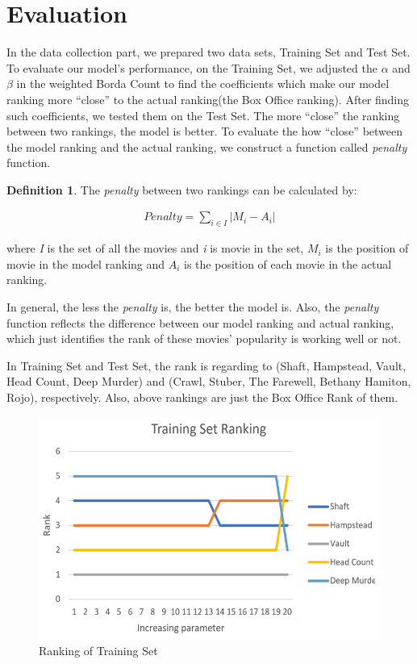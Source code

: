 \documentclass[conference]{IEEEtran}
\theoremstyle{definition}
\newtheorem{definition}{Definition}
\begin{document}
\section{Evaluation}
In the data collection part, we prepared two data sets, Training Set and Test
Set. To evaluate our model's performance, on the Training Set, we adjusted the
$\alpha$ and $\beta$ in the weighted Borda Count to find the coefficients which
make our model ranking more ``close'' to the actual ranking(the Box Office ranking). After finding such coefficients, we
tested them on the Test Set. The more ``close'' the ranking between two rankings,
the model is better. To evaluate the how ``close'' between the model
ranking and the actual ranking, we construct a function called \textit{penalty}
function. 
\begin{definition}{The \textit{penalty} between two rankings can be calculated by:}
	
	\begin{align}
	Penalty = \sum_{i\in I}{|M_i - A_i|}
	\end{align}
	
	where \textit{I} is the set of all the movies and \textit{i} is movie in the
	set, $M_i$ is the position of movie in the model ranking and $A_i$ is the
	position of each movie in the actual ranking.
	
\end{definition}

In general, the less the \textit{penalty} is, the better the model is. Also, the
\textit{penalty} function reflects the difference between our model ranking and
actual ranking, which just identifies the rank of these movies' popularity is
working well or not.

In Training Set and Test Set, the rank is regarding to (Shaft, Hampstead, Vault,
Head Count, Deep Murder) and (Crawl, Stuber, The Farewell, Bethany Hamiton,
Rojo), respectively. Also, above rankings are just the Box Office Rank of them.





\begin{figure}[htb] \centering
	\centerline{\includegraphics[width=0.8\linewidth]{training_rank.png}}
	\caption{Ranking of Training Set}
	\label{fig}
\end{figure}
\end{document}

